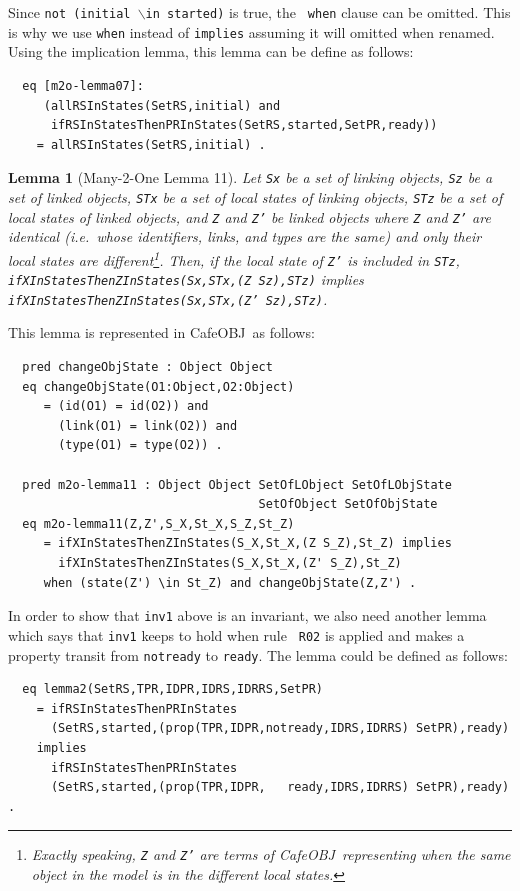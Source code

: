 \documentclass[12pt]{report}
\newtheorem{lemma}{Lemma}
\newcommand{\stt}[1]{{\small{\tt {#1}}}}
\newcommand{\cafeobj}{{\sf CafeOBJ}~}
\begin{document}
Since \stt{not (initial $\backslash$in started)} is true, the {\tt
  when} clause can be omitted. This is why we use {\tt when} instead
of {\tt implies} assuming it will omitted when renamed. Using the
implication lemma, this lemma can be define as follows:
\begin{verbatim}
  eq [m2o-lemma07]:
     (allRSInStates(SetRS,initial) and
      ifRSInStatesThenPRInStates(SetRS,started,SetPR,ready))
    = allRSInStates(SetRS,initial) .
\end{verbatim}

\begin{lemma}[Many-2-One Lemma 11]
  Let {\tt Sx} be a set of linking objects, {\tt Sz} be a set of
  linked objects, {\tt STx} be a set of local states of linking
  objects, {\tt STz} be a set of local states of linked objects, and
  {\tt Z} and {\tt Z'} be linked objects where {\tt Z} and {\tt Z'}
  are identical (i.e.\ whose identifiers, links, and types are the
  same) and only their local states are different\footnote{Exactly
    speaking, {\tt Z} and {\tt Z'} are terms of \cafeobj representing
    when the same object in the model is in the different local
    states.}.  Then, if the local state of {\tt Z'} is included in
  {\tt STz}, \stt{ifXInStatesThenZInStates(Sx,STx,(Z Sz),STz)}
  implies\\ \stt{ifXInStatesThenZInStates(Sx,STx,(Z' Sz),STz)}.
\end{lemma}
This lemma is represented in \cafeobj as follows:
\begin{verbatim}
  pred changeObjState : Object Object
  eq changeObjState(O1:Object,O2:Object)
     = (id(O1) = id(O2)) and 
       (link(O1) = link(O2)) and
       (type(O1) = type(O2)) .

  pred m2o-lemma11 : Object Object SetOfLObject SetOfLObjState
                                   SetOfObject SetOfObjState
  eq m2o-lemma11(Z,Z',S_X,St_X,S_Z,St_Z)
     = ifXInStatesThenZInStates(S_X,St_X,(Z S_Z),St_Z) implies
       ifXInStatesThenZInStates(S_X,St_X,(Z' S_Z),St_Z) 
     when (state(Z') \in St_Z) and changeObjState(Z,Z') .
\end{verbatim}
In order to show that {\tt inv1} above is an invariant, we also need
another lemma which says that {\tt inv1} keeps to hold when rule {\tt
  R02} is applied and makes a property transit from {\tt notready} to
{\tt ready}.  The lemma could be defined as follows:
\begin{verbatim}
  eq lemma2(SetRS,TPR,IDPR,IDRS,IDRRS,SetPR)
    = ifRSInStatesThenPRInStates
      (SetRS,started,(prop(TPR,IDPR,notready,IDRS,IDRRS) SetPR),ready)
    implies
      ifRSInStatesThenPRInStates
      (SetRS,started,(prop(TPR,IDPR,   ready,IDRS,IDRRS) SetPR),ready) .
\end{verbatim}
\end{document}
